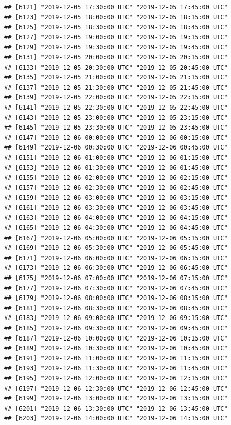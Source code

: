 \documentclass{article}\usepackage[]{graphicx}\usepackage[]{color}
\makeatletter
\newenvironment{kframe}{%
 \def\at@end@of@kframe{}%
 \ifinner\ifhmode%
  \def\at@end@of@kframe{\end{minipage}}%
  \begin{minipage}{\columnwidth}%
 \fi\fi%
 \def\FrameCommand##1{\hskip\@totalleftmargin \hskip-\fboxsep
 \colorbox{shadecolor}{##1}\hskip-\fboxsep
     \hskip-\linewidth \hskip-\@totalleftmargin \hskip\columnwidth}%
 \MakeFramed {\advance\hsize-\width
   \@totalleftmargin\z@ \linewidth\hsize
   \@setminipage}}%
 {\par\unskip\endMakeFramed%
 \at@end@of@kframe}
\newenvironment{knitrout}{}{} %
\makeatother
\begin{document}
\begin{knitrout}
\begin{kframe}
\begin{verbatim}
## [6121] "2019-12-05 17:30:00 UTC" "2019-12-05 17:45:00 UTC"
## [6123] "2019-12-05 18:00:00 UTC" "2019-12-05 18:15:00 UTC"
## [6125] "2019-12-05 18:30:00 UTC" "2019-12-05 18:45:00 UTC"
## [6127] "2019-12-05 19:00:00 UTC" "2019-12-05 19:15:00 UTC"
## [6129] "2019-12-05 19:30:00 UTC" "2019-12-05 19:45:00 UTC"
## [6131] "2019-12-05 20:00:00 UTC" "2019-12-05 20:15:00 UTC"
## [6133] "2019-12-05 20:30:00 UTC" "2019-12-05 20:45:00 UTC"
## [6135] "2019-12-05 21:00:00 UTC" "2019-12-05 21:15:00 UTC"
## [6137] "2019-12-05 21:30:00 UTC" "2019-12-05 21:45:00 UTC"
## [6139] "2019-12-05 22:00:00 UTC" "2019-12-05 22:15:00 UTC"
## [6141] "2019-12-05 22:30:00 UTC" "2019-12-05 22:45:00 UTC"
## [6143] "2019-12-05 23:00:00 UTC" "2019-12-05 23:15:00 UTC"
## [6145] "2019-12-05 23:30:00 UTC" "2019-12-05 23:45:00 UTC"
## [6147] "2019-12-06 00:00:00 UTC" "2019-12-06 00:15:00 UTC"
## [6149] "2019-12-06 00:30:00 UTC" "2019-12-06 00:45:00 UTC"
## [6151] "2019-12-06 01:00:00 UTC" "2019-12-06 01:15:00 UTC"
## [6153] "2019-12-06 01:30:00 UTC" "2019-12-06 01:45:00 UTC"
## [6155] "2019-12-06 02:00:00 UTC" "2019-12-06 02:15:00 UTC"
## [6157] "2019-12-06 02:30:00 UTC" "2019-12-06 02:45:00 UTC"
## [6159] "2019-12-06 03:00:00 UTC" "2019-12-06 03:15:00 UTC"
## [6161] "2019-12-06 03:30:00 UTC" "2019-12-06 03:45:00 UTC"
## [6163] "2019-12-06 04:00:00 UTC" "2019-12-06 04:15:00 UTC"
## [6165] "2019-12-06 04:30:00 UTC" "2019-12-06 04:45:00 UTC"
## [6167] "2019-12-06 05:00:00 UTC" "2019-12-06 05:15:00 UTC"
## [6169] "2019-12-06 05:30:00 UTC" "2019-12-06 05:45:00 UTC"
## [6171] "2019-12-06 06:00:00 UTC" "2019-12-06 06:15:00 UTC"
## [6173] "2019-12-06 06:30:00 UTC" "2019-12-06 06:45:00 UTC"
## [6175] "2019-12-06 07:00:00 UTC" "2019-12-06 07:15:00 UTC"
## [6177] "2019-12-06 07:30:00 UTC" "2019-12-06 07:45:00 UTC"
## [6179] "2019-12-06 08:00:00 UTC" "2019-12-06 08:15:00 UTC"
## [6181] "2019-12-06 08:30:00 UTC" "2019-12-06 08:45:00 UTC"
## [6183] "2019-12-06 09:00:00 UTC" "2019-12-06 09:15:00 UTC"
## [6185] "2019-12-06 09:30:00 UTC" "2019-12-06 09:45:00 UTC"
## [6187] "2019-12-06 10:00:00 UTC" "2019-12-06 10:15:00 UTC"
## [6189] "2019-12-06 10:30:00 UTC" "2019-12-06 10:45:00 UTC"
## [6191] "2019-12-06 11:00:00 UTC" "2019-12-06 11:15:00 UTC"
## [6193] "2019-12-06 11:30:00 UTC" "2019-12-06 11:45:00 UTC"
## [6195] "2019-12-06 12:00:00 UTC" "2019-12-06 12:15:00 UTC"
## [6197] "2019-12-06 12:30:00 UTC" "2019-12-06 12:45:00 UTC"
## [6199] "2019-12-06 13:00:00 UTC" "2019-12-06 13:15:00 UTC"
## [6201] "2019-12-06 13:30:00 UTC" "2019-12-06 13:45:00 UTC"
## [6203] "2019-12-06 14:00:00 UTC" "2019-12-06 14:15:00 UTC"

\end{verbatim}
\end{kframe}
\end{knitrout}
\end{document}
